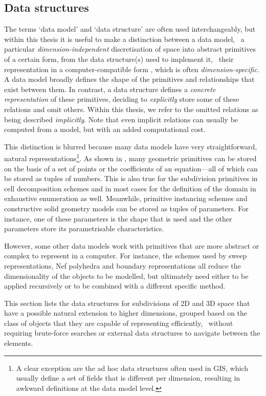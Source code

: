 \subsection{Data structures}
\label{ss:data-structures}

The terms `data model' and `data structure' are often used interchangeably, but within this thesis it is useful to make a distinction between a data model, \ie\ a particular \emph{dimension-independent} discretisation of space into abstract primitives of a certain form, from the data structure(s) used to implement it, \ie\ their representation in a computer-compatible form \citep{Frank92}, which is often \emph{dimension-specific}.
A data model broadly defines the shape of the primitives and relationships that exist between them.
In contrast, a data structure defines a \emph{concrete representation} of these primitives, deciding to \emph{explicitly} store some of these relations and omit others.
Within this thesis, we refer to the omitted relations as being described \emph{implicitly}.
Note that even implicit relations can usually be computed from a model, but with an added computational cost.

This distinction is blurred because many data models have very straightforward, natural representations\footnote{A clear exception are the ad hoc data structures often used in GIS, which usually define a set of fields that is different per dimension, resulting in awkward definitions at the data model level.}.
As shown in , many geometric primitives can be stored on the basis of a set of points or the coefficients of an equation---all of which can be stored as tuples of numbers.
This is also true for the subdivision primitives in cell decomposition schemes and in most cases for the definition of the domain in exhaustive enumeration as well.
Meanwhile, primitive instancing schemes and constructive solid geometry models can be stored as tuples of parameters.
For instance, one of these parameters is the shape that is used and the other parameters store its parametrisable characteristics.

However, some other data models work with primitives that are more abstract or complex to represent in a computer.
For instance, the schemes used by sweep representations, Nef polyhedra and boundary representations all reduce the dimensionality of the objects to be modelled, but ultimately need either to be applied recursively or to be combined with a different specific method.

This section lists the data structures for subdivisions of 2D and 3D space that have a possible natural extension to higher dimensions, grouped based on the class of objects that they are capable of representing efficiently,
\ie\ without requiring brute-force searches or external data structures to navigate between the elements.

